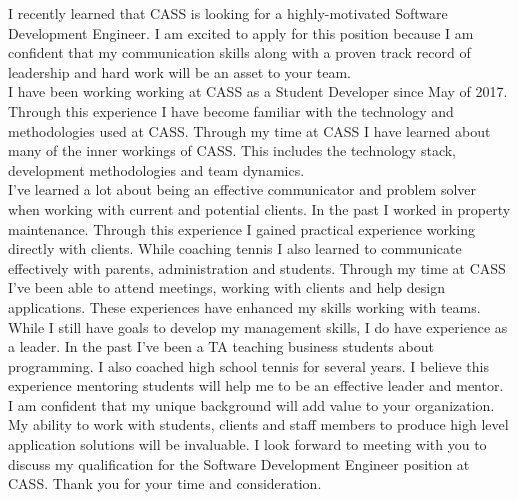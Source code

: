 \documentclass[11pt, a4paper]{awesome-cv}
\begin{document}
\makecvheader

\makelettertitle

\begin{cvletter}
    I recently learned that CASS is looking for a highly-motivated Software Development Engineer. I am excited to apply for this position because I am confident that my communication skills along with a proven track record of leadership and hard work will be an asset to your team.\\
    
   I have been working working at CASS as a Student Developer since May of 2017. Through this experience I have become familiar with the technology and methodologies used at CASS. Through my time at CASS I have learned about many of the inner workings of CASS. This includes the technology stack, development methodologies and team dynamics.\\
    
   I've learned a lot about being an effective communicator and problem solver when working with current and potential clients. In the past I worked in property maintenance. Through this experience I gained practical experience working directly with clients. While coaching tennis I also learned to communicate effectively with parents, administration and students. Through my time at CASS I've been able to attend meetings, working with clients and help design applications. These experiences have enhanced my skills working with teams. \\
    
    While I still have goals to develop my management skills, I do have experience as a leader. In the past I've been a TA teaching business students about programming. I also coached high school tennis for several years. I believe this experience mentoring students will help me to be an effective leader and mentor.\\
    
    I am confident that my unique background will add value to your organization. My ability to work with students, clients and staff members to produce high level application solutions will be invaluable. I look forward to meeting with you to discuss my qualification for the Software Development Engineer position at CASS. Thank you for your time and consideration.\\

\end{cvletter}

\makeletterclosing
\end{document}
